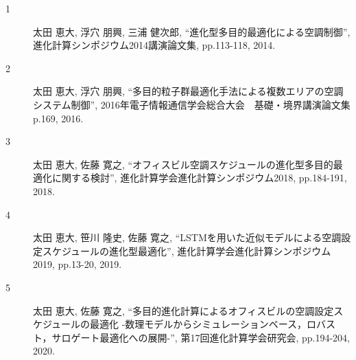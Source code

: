{\Large {}}
\begin{description}
      \item[1] 太田 恵大, 浮穴 朋興, 三浦 健次郎,
            ``進化型多目的最適化による空調制御'',
            進化計算シンポジウム2014講演論文集, pp.113-118, 2014.

      \item[2] 太田 恵大, 浮穴 朋興,
            ``多目的粒子群最適化手法による複数エリアの空調システム制御'',
            2016年電子情報通信学会総合大会　基礎・境界講演論文集 p.169, 2016.

      \item[3] 太田 恵大, 佐藤 寛之,
            ``オフィスビル空調スケジュールの進化型多目的最適化に関する検討'',
            進化計算学会進化計算シンポジウム2018, pp.184-191, 2018.

      \item[4] 太田 恵大, 笹川 隆史, 佐藤 寛之,
            ``LSTMを用いた近似モデルによる空調設定スケジュールの進化型最適化'',
            進化計算学会進化計算シンポジウム2019, pp.13-20, 2019.

      \item[5] 太田 恵大, 佐藤 寛之,
            ``多目的進化計算によるオフィスビルの空調設定スケジュールの最適化
            -数理モデルからシミュレーションベース，ロバスト，サロゲート最適化への展開-'',
            第17回進化計算学会研究会, pp.194-204, 2020.
\end{description}

\begin{comment}
{\Large \gt{特許}}
\begin{description}
      \item[1] 南田宗佑, 妻鹿利宏, 冨澤一生, 太田恵大, 浮穴朋興, 三浦健次郎,
            ``空調制御装置及びプログラム``,
            2014/12/17出願, 2017/11/10登録 (特願2014-254694, 特許第6238883号).

      \item[2] 太田恵大, 浮穴朋興,
            ``制御装置及び制御プログラム``,
            2016/02/24出願, 2017/01/13登録 (特願2016-550287, 特許第6073000号).

      \item[3] 太田恵大, 浮穴朋興,
            ``運転制御装置，空気調和システム，運転制御方法および運転制御プログラム``,
            2017/07/05出願, 2019/10/25登録 (特願2019-527263, 特許第6605181号).
\end{description}
\end{comment}


